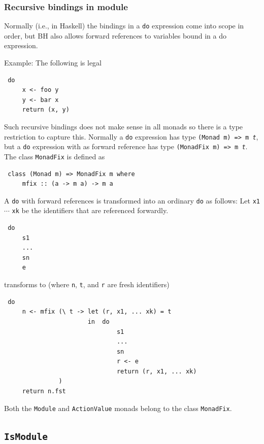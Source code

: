 \documentclass[twoside,letterpaper]{article}
\newcommand{\BH}{BH}
\newcommand{\te}[1]{\texttt{#1}}
\begin{document}

\subsubsection{Recursive bindings in module}
Normally (i.e., in Haskell) the bindings in a \te{do} expression come into scope in order,
but {\BH} also allows forward references to variables bound in a do expression.

Example: The following is legal
\begin{verbatim}
 do
     x <- foo y
     y <- bar x
     return (x, y)
\end{verbatim}

Such recursive bindings does not make sense in all monads so there is a type
restriction to capture this.  Normally a \te{do} expression has type \te{(Monad m) => m \it{t}},
but a \te{do} expression with as forward reference has type \te{(MonadFix m) => m \it{t}}.
The class \te{MonadFix} is defined as
\begin{verbatim}
 class (Monad m) => MonadFix m where
     mfix :: (a -> m a) -> m a
\end{verbatim}

A \te{do} with forward references is transformed into an ordinary \te{do} as follows:
Let \te{x1} $\cdots$ \te{xk} be the identifiers that are referenced forwardly.
\begin{verbatim}
 do
     s1
     ...
     sn
     e
\end{verbatim}
transforms to (where \te{n}, \te{t}, and \te{r} are fresh identifiers)
\begin{verbatim}
 do
     n <- mfix (\ t -> let (r, x1, ... xk) = t
                       in  do
                               s1
                               ...
                               sn
                               r <- e
                               return (r, x1, ... xk)
               )
     return n.fst
\end{verbatim}

Both the \te{Module} and \te{ActionValue} monads belong to the class \te{MonadFix}.



\subsection{\te{IsModule}}
\end{document}
